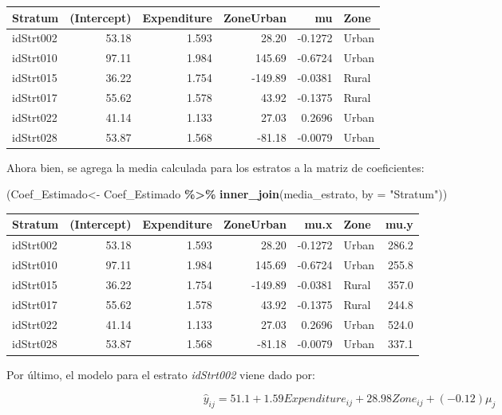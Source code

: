 \documentclass[
  spanish,
  12pt,
]{book}
\newenvironment{Shaded}{\begin{snugshade}}{\end{snugshade}}
\newcommand{\AttributeTok}[1]{\textcolor[rgb]{0.13,0.29,0.53}{#1}}
\newcommand{\FunctionTok}[1]{\textcolor[rgb]{0.13,0.29,0.53}{\textbf{#1}}}
\newcommand{\NormalTok}[1]{#1}
\newcommand{\OtherTok}[1]{\textcolor[rgb]{0.56,0.35,0.01}{#1}}
\newcommand{\SpecialCharTok}[1]{\textcolor[rgb]{0.81,0.36,0.00}{\textbf{#1}}}
\newcommand{\StringTok}[1]{\textcolor[rgb]{0.31,0.60,0.02}{#1}}
\begin{document}
\begin{tabular}{l|r|r|r|r|l}
\hline
Stratum & (Intercept) & Expenditure & ZoneUrban & mu & Zone\\
\hline
idStrt002 & 53.18 & 1.593 & 28.20 & -0.1272 & Urban\\
\hline
idStrt010 & 97.11 & 1.984 & 145.69 & -0.6724 & Urban\\
\hline
idStrt015 & 36.22 & 1.754 & -149.89 & -0.0381 & Rural\\
\hline
idStrt017 & 55.62 & 1.578 & 43.92 & -0.1375 & Rural\\
\hline
idStrt022 & 41.14 & 1.133 & 27.03 & 0.2696 & Urban\\
\hline
idStrt028 & 53.87 & 1.568 & -81.18 & -0.0079 & Urban\\
\hline
\end{tabular}

Ahora bien, se agrega la media calculada para los estratos a la matriz de coeficientes:

\begin{Shaded}
\begin{Highlighting}[]
\NormalTok{(Coef\_Estimado}\OtherTok{\textless{}{-}}\NormalTok{ Coef\_Estimado }\SpecialCharTok{\%\textgreater{}\%}  \FunctionTok{inner\_join}\NormalTok{(media\_estrato, }\AttributeTok{by =} \StringTok{"Stratum"}\NormalTok{))}
\end{Highlighting}
\end{Shaded}

\begin{tabular}{l|r|r|r|r|l|r}
\hline
Stratum & (Intercept) & Expenditure & ZoneUrban & mu.x & Zone & mu.y\\
\hline
idStrt002 & 53.18 & 1.593 & 28.20 & -0.1272 & Urban & 286.2\\
\hline
idStrt010 & 97.11 & 1.984 & 145.69 & -0.6724 & Urban & 255.8\\
\hline
idStrt015 & 36.22 & 1.754 & -149.89 & -0.0381 & Rural & 357.0\\
\hline
idStrt017 & 55.62 & 1.578 & 43.92 & -0.1375 & Rural & 244.8\\
\hline
idStrt022 & 41.14 & 1.133 & 27.03 & 0.2696 & Urban & 524.0\\
\hline
idStrt028 & 53.87 & 1.568 & -81.18 & -0.0079 & Urban & 337.1\\
\hline
\end{tabular}

Por último, el modelo para el estrato \emph{idStrt002} viene dado por:

\[
\hat{y}_{ij}=51.1+1.59Expenditure_{ij}+28.98Zone_{ij}+\left(-0.12\right)\mu_{j}
\]
\end{document}
